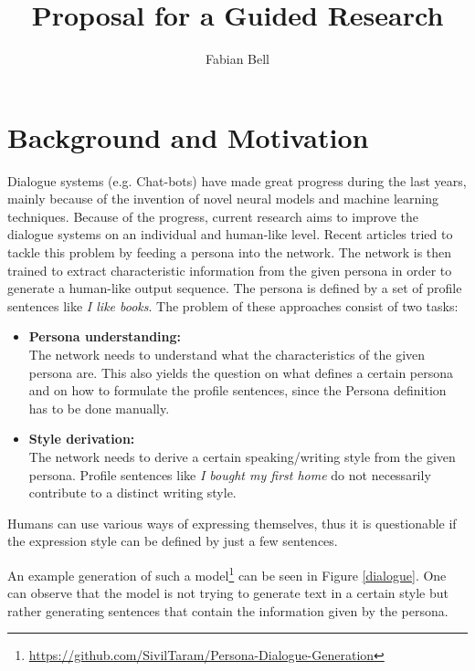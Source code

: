 \documentclass[11pt]{article}
\title{Proposal for a Guided Research}
\author{Fabian Bell}
\date
\begin{document}
\maketitle
\section{Background and Motivation}
Dialogue systems (e.g. Chat-bots) have made great progress during the last years, mainly because of the invention of novel neural models and machine learning techniques. Because of the progress, current research aims to improve the dialogue systems on an individual and human-like level. Recent articles \cite[]{DBLP:journals/corr/abs-1901-08149, liu2020impress} tried to tackle this problem by feeding a persona into the network. The network is then trained to extract characteristic information from the given persona in order to generate a human-like output sequence. The persona is defined by a set of profile sentences like \textit{I like books}. The problem of these approaches consist of two tasks:
\begin{itemize}
\item \textbf{Persona understanding:}\\
The network needs to understand what the characteristics of the given persona are. This also yields the question on what defines a certain persona and on how to formulate the profile sentences, since the Persona definition has to be done manually. 
\item \textbf{Style derivation:}\\
The network needs to derive a certain speaking/writing style from the given persona. Profile sentences like \textit{I bought my first home} \cite[]{liu2020impress} do not necessarily contribute to a distinct writing style.
\end{itemize}
Humans can use various ways of expressing themselves, thus it is questionable if the expression style can be defined by just a few sentences. 

An example generation of such a model\footnote{\url{https://github.com/SivilTaram/Persona-Dialogue-Generation}} can be seen in Figure \ref{dialogue}. One can observe that the model is not trying to generate text in a certain style but rather generating sentences that contain the information given by the persona. 
\end{document}
